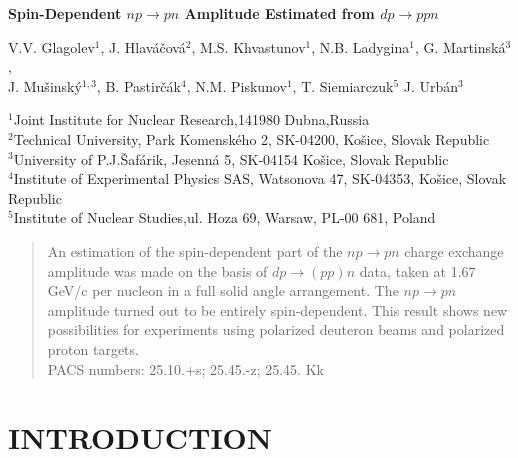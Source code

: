 \setlength{\textheight}{25 cm}
\setlength{\textwidth}{16.5 cm}
\setlength{\oddsidemargin}{0.5 cm}
\setlength{\topmargin}{-2.0 cm}
\setlength{\evensidemargin}{-0.5 cm}
\setlength{\footskip}{2\baselineskip}
\setlength{\headheight}{1\baselineskip}


\begin{center}
{\Large\bf Spin-Dependent $np \rightarrow pn$ Amplitude Estimated
\hspace {125mm}
from  $dp\rightarrow ppn$
}
\end {center}
\bigskip
\begin{flushleft}
V.V. Glagolev$^{1}$, J. Hlav\'{a}\v{c}ov\'{a}$^{2}$,
M.S. Khvastunov$^{1}$,
N.B. Ladygina$^{1}$, G. Martinsk\'{a}$^{3}$,\\ J. Mu\v sinsk\'y$^{1,3}$,
B. Pastir\v c\'ak$^{4}$, N.M. Piskunov$^{1}$, T. Siemiarczuk$^{5}$
J. Urb\'{a}n$^{3}$ \\
\bigskip

\small{
$^{1}$Joint Institute for Nuclear Research,141980 Dubna,Russia\\
$^{2}$Technical University, Park Komensk\'{e}ho 2, SK-04200, Ko\v{s}ice, Slovak Republic\\
$^{3}$University of P.J.\v{S}af\'{a}rik, Jesenn\'{a} 5, SK-04154 Ko\v{s}ice, Slovak Republic \\
$^{4}$Institute of Experimental Physics SAS, Watsonova 47, SK-04353, Ko\v{s}ice, Slovak Republic \\
$^{5}$Institute of Nuclear Studies,ul. Hoza 69, Warsaw,  PL-00 681, Poland
\\}

\end{flushleft}

\bigskip

\begin{abstract}
\noindent
An estimation of the spin-dependent part of the $np\to pn$ charge exchange
amplitude was made on the basis of  $dp\to (pp)n$ data, taken
at 1.67 GeV/c per nucleon in a full solid angle arrangement.
The
$np\to pn$ amplitude turned out to be  entirely spin-dependent.
This result shows
new possibilities for experiments using polarized deuteron beams and
polarized proton targets.\\

PACS numbers: 25.10.+s; 25.45.-z; 25.45. Kk
\end{abstract}
\newpage

\section{INTRODUCTION}
\indent

